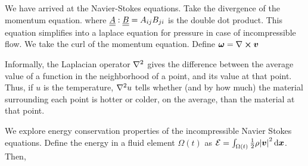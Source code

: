 We have arrived at the Navier-Stokes equations.
Take the divergence of the momentum equation.
where $\underline{\underline{A}}:\underline{\underline{B}}=A_{ij}B_{ji}$ is the double dot product. This equation simplifies into a laplace equation for pressure in case of incompressible flow.
We take the curl of the momentum equation. Define $\boldsymbol{\omega}=\nabla\cross\boldsymbol{v}$


Informally, the Laplacian operator $\nabla^2$ gives the difference between the average value of a function in the neighborhood of a point, and its value at that point. Thus, if $u$ is the temperature, $\nabla^2 u$ tells whether (and by how much) the material surrounding each point is hotter or colder, on the average, than the material at that point.

We explore energy conservation properties of the incompressible Navier Stokes equations. Define the energy in a fluid element $\Omega(t)$ as $\mathcal{E}=\int_{\Omega(t)}\frac{1}{2}\rho\abs{\boldsymbol{v}}^2\,\mathrm{d}\boldsymbol{x}$. Then,


